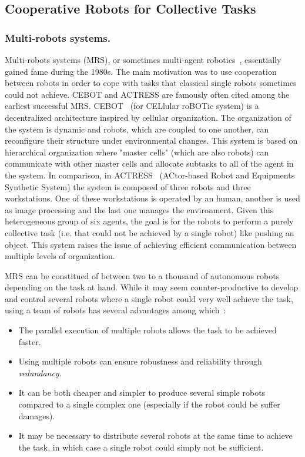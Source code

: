   \subsection{Cooperative Robots for Collective Tasks}

    \subsubsection{Multi-robots systems.} Multi-robots systems (MRS), or sometimes multi-agent robotics~\parencite{Dudek1996}, essentially gained fame during the 1980s. The main motivation was to use cooperation between robots in order to cope with tasks that classical single robots sometimes could not achieve. CEBOT and ACTRESS are famously often cited among the earliest successful MRS. CEBOT~\parencite{Fukuda1988} (for CELlular roBOTic system) is a decentralized architecture inspired by cellular organization. The organization of the system is dynamic and robots, which are coupled to one another, can reconfigure their structure under environmental changes. This system is based on hierarchical organization where "master cells" (which are also robots) can communicate with other master cells and allocate subtasks to all of the agent in the system. In comparison, in ACTRESS~\parencite{Asama1989} (ACtor-based Robot and Equipments Synthetic System) the system is composed of three robots and three workstations. One of these workstations is operated by an human, another is used as image processing and the last one manages the environment. Given this heterogeneous group of six agents, the goal is for the robots to perform a purely collective task (i.e. that could not be achieved by a single robot) like pushing an object. This system raises the issue of achieving  efficient communication between multiple levels of organization.

    MRS can be constitued of between two to a thousand of autonomous robots~\parencite{Rubenstein2014} depending on the task at hand. While it may seem counter-productive to develop and control several robots where a single robot could very well achieve the task, using a team of robots has several advantages among which~\parencite{Cao1997, Arkin1998}:

    \begin{itemize}
      \item{The parallel execution of multiple robots allows the task to be achieved faster.}
      \item{Using multiple robots can ensure robustness and reliability through \emph{redundancy}.}
      \item{It can be both cheaper and simpler to produce several simple robots compared to a single complex one (especially if the robot could be suffer damages).}
      \item{It may be necessary to distribute several robots at the same time to achieve the task, in which case a single robot could simply not be sufficient.}
    \end{itemize}

